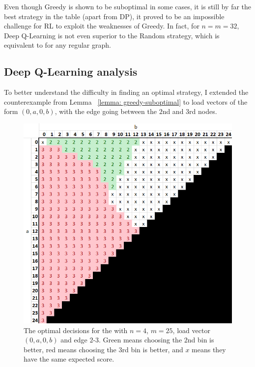 Even though Greedy is shown to be suboptimal in some cases, it is still by far the best strategy in the table (apart from DP), it proved to be an impossible challenge for RL to exploit the weaknesses of Greedy. In fact, for $n=m=32$, Deep Q-Learning is not even superior to the Random strategy, which is equivalent to \OneChoice for any regular graph.


\subsection{Deep Q-Learning analysis}

To better understand the difficulty in finding an optimal strategy, I extended the \CycleGraph counterexample from Lemma ~\ref{lemma: greedy-suboptimal} to load vectors of the form $(0, a, 0, b)$, with the edge going between the $2$nd and $3$rd nodes. 


\begin{figure}[hbt!] \label{greedy-counterexample-analysed}
    \centering
    \includegraphics[scale=1.0]{Chapter4/Figs/0a0b_4_25_analysis.png}
    \caption{The optimal decisions for the \CycleGraph with $n=4$, $m=25$, load vector $(0,a,0,b)$ and edge $2$-$3$. Green means choosing the $2$nd bin is better, red means choosing the $3$rd bin is better, and $x$ means they have the same expected score.}
\end{figure}


